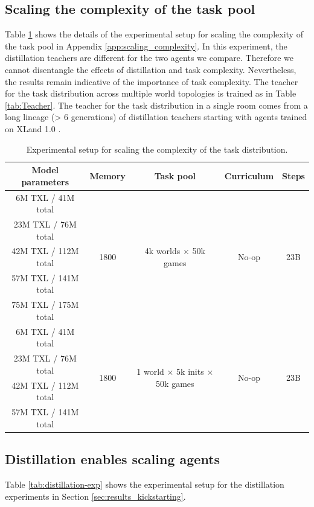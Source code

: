 \subsection{Scaling the complexity of the task pool}
\label{app:task-complexity-scaling}
Table \ref{tab:task_complexity_scaling} shows the details of the experimental setup for scaling the complexity of the task pool in Appendix \ref{app:scaling_complexity}. In this experiment, the distillation teachers are different for the two agents we compare. Therefore we cannot disentangle the effects of distillation and task complexity. Nevertheless, the results remain indicative of the importance of task complexity. The teacher for the task distribution across multiple world topologies is trained as in Table \ref{tab:Teacher}. The teacher for the task distribution in a single room comes from a long lineage (> 6 generations) of distillation teachers starting with agents trained on XLand 1.0 \citep{xland}.

\begin{table}[h!]
  \begin{center}
    \caption{Experimental setup for scaling the complexity of the task distribution.}
    \begin{tabular}{c|c|c|c|c}
    \label{tab:task_complexity_scaling}
      Model parameters & Memory & Task pool & Curriculum  & Steps \\ %
      \hline
      6M TXL / 41M total & \multirow{5}{*}{1800} & \multirow{5}{*}{4k worlds $\times$ 50k games} & \multirow{5}{*}{No-op} & \multirow{5}{*}{23B}\\ %
      23M TXL / 76M total&&&&\\ %
      42M TXL / 112M total&&&&\\
      57M TXL / 141M total&&&&\\
      75M TXL / 175M total&&&&\\
      \hline
      6M TXL / 41M total &  \multirow{4}{*}{1800} & \multirow{4}{*}{1 world $\times$ 5k inits $\times$ 50k games} & \multirow{4}{*}{No-op}&\multirow{4}{*}{23B}\\ %
      23M TXL / 76M total&&&&\\ %
      42M TXL / 112M total&&&&\\
      57M TXL / 141M total&&&&\\
    \end{tabular}
  \end{center}
\end{table}


\subsection{Distillation enables scaling agents}
\label{app:distillation-exp}
Table \ref{tab:distillation-exp} shows the experimental setup for the distillation experiments in Section \ref{sec:results_kickstarting}.

